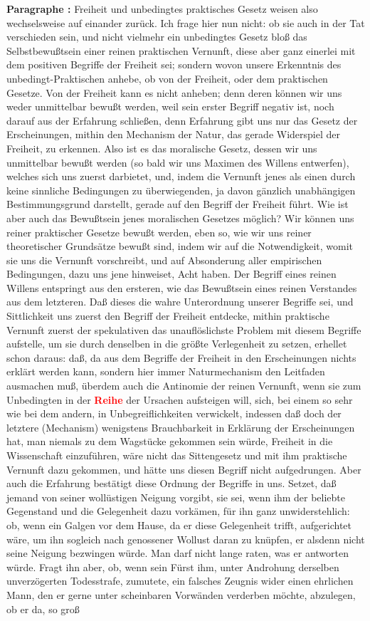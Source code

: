 \documentclass[a4paper,12pt,twoside]{book}
\newcommand{\match}[1]{\textcolor{red}{\textbf{#1}}}
\begin{document}
	\noindent\textbf{Paragraphe : }Freiheit und unbedingtes praktisches Gesetz weisen also wechselsweise auf einander zurück. Ich frage hier nun nicht: ob sie auch in der Tat verschieden sein, und nicht vielmehr ein unbedingtes Gesetz bloß das Selbstbewußtsein einer reinen praktischen Vernunft, diese aber ganz einerlei mit dem positiven Begriffe der Freiheit sei; sondern wovon unsere Erkenntnis des unbedingt-Praktischen anhebe, ob von der Freiheit, oder dem praktischen Gesetze. Von der Freiheit kann es nicht anheben; denn deren können wir uns weder unmittelbar bewußt werden, weil sein erster Begriff negativ ist, noch darauf aus der Erfahrung schließen, denn Erfahrung gibt uns nur das Gesetz der Erscheinungen, mithin den Mechanism der Natur, das gerade Widerspiel der Freiheit, zu erkennen. Also ist es das moralische Gesetz, dessen wir uns unmittelbar bewußt werden (so bald wir uns Maximen des Willens entwerfen), welches sich uns zuerst darbietet, und, indem die Vernunft jenes als einen durch keine sinnliche Bedingungen zu überwiegenden, ja davon gänzlich unabhängigen Bestimmungsgrund darstellt, gerade auf den Begriff der Freiheit führt. Wie ist aber auch das Bewußtsein jenes moralischen Gesetzes möglich? Wir können uns reiner praktischer Gesetze bewußt werden, eben so, wie wir uns reiner theoretischer Grundsätze bewußt sind, indem wir auf die Notwendigkeit, womit sie uns die Vernunft vorschreibt, und auf Absonderung aller empirischen Bedingungen, dazu uns jene hinweiset, Acht haben. Der Begriff eines reinen Willens entspringt aus den ersteren, wie das Bewußtsein eines reinen Verstandes aus dem letzteren. Daß dieses die wahre Unterordnung unserer Begriffe sei, und Sittlichkeit uns zuerst den Begriff der Freiheit entdecke, mithin praktische Vernunft zuerst der spekulativen das unauflöslichste Problem mit diesem Begriffe aufstelle, um sie durch denselben in die größte Verlegenheit zu setzen, erhellet schon daraus: daß, da aus dem Begriffe der  Freiheit in den Erscheinungen nichts erklärt werden kann, sondern hier immer Naturmechanism den Leitfaden ausmachen muß, überdem auch die Antinomie der reinen Vernunft, wenn sie zum Unbedingten in der \match{Reihe} der Ursachen aufsteigen will, sich, bei einem so sehr wie bei dem andern, in Unbegreiflichkeiten verwickelt, indessen daß doch der letztere (Mechanism) wenigstens Brauchbarkeit in Erklärung der Erscheinungen hat, man niemals zu dem Wagstücke gekommen sein würde, Freiheit in die Wissenschaft einzuführen, wäre nicht das Sittengesetz und mit ihm praktische Vernunft dazu gekommen, und hätte uns diesen Begriff nicht aufgedrungen. Aber auch die Erfahrung bestätigt diese Ordnung der Begriffe in uns. Setzet, daß jemand von seiner wollüstigen Neigung vorgibt, sie sei, wenn ihm der beliebte Gegenstand und die Gelegenheit dazu vorkämen, für ihn ganz unwiderstehlich: ob, wenn ein Galgen vor dem Hause, da er diese Gelegenheit trifft, aufgerichtet wäre, um ihn sogleich nach genossener Wollust daran zu knüpfen, er alsdenn nicht seine Neigung bezwingen würde. Man darf nicht lange raten, was er antworten würde. Fragt ihn aber, ob, wenn sein Fürst ihm, unter Androhung derselben unverzögerten Todesstrafe, zumutete, ein falsches Zeugnis wider einen ehrlichen Mann, den er gerne unter scheinbaren Vorwänden verderben möchte, abzulegen, ob er da, so groß 
\end{document}
